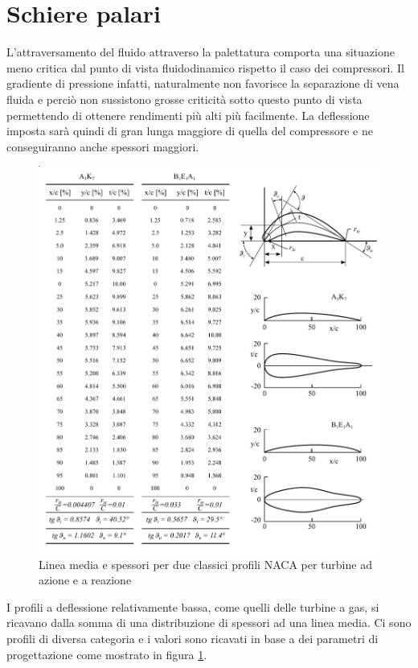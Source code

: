 \section{Schiere palari}
L'attraversamento del fluido attraverso la palettatura comporta una situazione meno critica dal punto di vista fluidodinamico rispetto il caso dei compressori. Il gradiente di pressione infatti, naturalmente non favorisce la separazione di vena fluida e perciò non sussistono grosse criticità sotto questo punto di vista permettendo di ottenere rendimenti più alti più facilmente. La deflessione imposta sarà quindi di gran lunga maggiore di quella del compressore e ne conseguiranno anche spessori maggiori. 
\begin{figure}
\centering
  \includegraphics[width=\textwidth]{fig/SchierePaleTab.pdf}
\caption{Linea media e spessori per due classici profili NACA per turbine ad azione e a reazione}
\label{fig:SchierePaleTab}
\end{figure}

I profili a deflessione relativamente bassa, come quelli delle turbine a gas, si ricavano dalla somma di una distribuzione di spessori ad una linea media. Ci sono profili di diversa categoria e i valori sono ricavati in base a dei parametri di progettazione come mostrato in figura \ref{fig:SchierePaleTab}.

